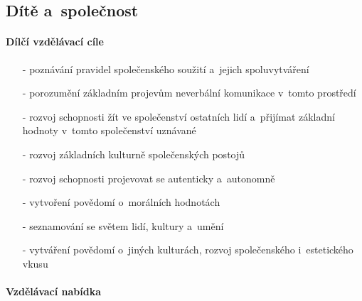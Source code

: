 			\subsection{Dítě a~společnost}
				\textit{} \citep[s.~26]{RVP}

					\paragraph{Dílčí vzdělávací cíle}

					\begin{itemize}
					\setlength\itemsep{-2mm}
						\item[-]poznávání pravidel společenského soužití a~jejich spoluvytváření
						\item[-]porozumění základním projevům neverbální komunikace v~tomto prostředí
						\item[-]rozvoj schopnosti žít ve společenství ostatních lidí a~přijímat základní hodnoty v~tomto společenství uznávané
						\item[-]rozvoj základních kulturně společenských postojů
						\item[-]rozvoj schopnosti projevovat se autenticky a~autonomně
						\item[-]vytvoření povědomí o~morálních hodnotách
						\item[-]seznamování se světem lidí, kultury a~umění
						\item[-]vytváření povědomí o~jiných kulturách, rozvoj společenského i~estetického vkusu
					\end{itemize}

					\paragraph{Vzdělávací nabídka}

